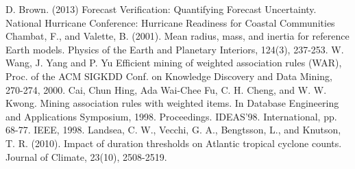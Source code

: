 \documentclass[12pt,conference]{IEEEtran}
\begin{document}
\begin{thebibliography}{1}
 D. Brown. (2013) Forecast Verification: Quantifying Forecast Uncertainty. National Hurricane Conference: Hurricane Readiness for Coastal Communities
 Chambat, F., and Valette, B. (2001). Mean radius, mass, and inertia for reference Earth models. Physics of the Earth and Planetary Interiors, 124(3), 237-253.
 W. Wang, J. Yang and P. Yu Efficient  mining of  weighted association rules (WAR), Proc. of the ACM SIGKDD Conf. on Knowledge Discovery and Data Mining, 270-274, 2000.
 Cai, Chun Hing, Ada Wai-Chee Fu, C. H. Cheng, and W. W. Kwong. Mining association rules with weighted items. In Database Engineering and Applications Symposium, 1998. Proceedings. IDEAS'98. International, pp. 68-77. IEEE, 1998.
 Landsea, C. W., Vecchi, G. A., Bengtsson, L., and Knutson, T. R. (2010). Impact of duration thresholds on Atlantic tropical cyclone counts. Journal of Climate, 23(10), 2508-2519.

\end{thebibliography}
\end{document}
